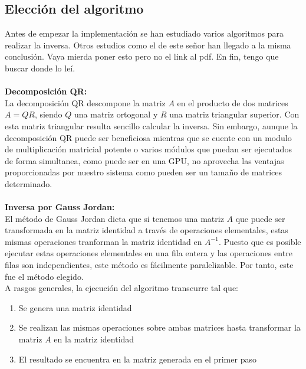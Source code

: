 \subsection{Elección del algoritmo}
Antes de empezar la implementación se han estudiado varios algoritmos para realizar la inversa.
Otros estudios como el de este señor han llegado a la misma conclusión. Vaya mierda poner esto pero no el link al pdf. En fin, tengo que buscar donde lo leí.
\\
\\
\textbf{Decomposición QR:}
\\
La decomposición QR descompone la matriz $A$ en el producto de dos matrices $A = QR$, siendo $Q$ una matriz ortogonal y $R$ una matriz triangular superior. Con esta matriz triangular resulta sencillo calcular la inversa. Sin embargo, aunque la decomposición QR puede ser beneficiosa mientras que se cuente con un modulo de multiplicación matricial potente o varios módulos que puedan ser ejecutados de forma simultanea, como puede ser en una GPU, no aprovecha las ventajas proporcionadas por nuestro sistema como pueden ser un tamaño de matrices determinado.
\\
\\
\textbf{Inversa por Gauss Jordan:}
\\
El método de Gauss Jordan dicta que si tenemos una matriz $A$ que puede ser transformada en la matriz identidad a través de operaciones elementales, estas mismas operaciones tranforman la matriz identidad en $A^{-1}$. Puesto que es posible ejecutar estas operaciones elementales en una fila entera y las operaciones entre filas son independientes, este método es fácilmente paralelizable.
Por tanto, este fue el método elegido.
\\
A rasgos generales, la ejecución del algoritmo transcurre tal que:
\begin{enumerate}
\item Se genera una matriz identidad
\item Se realizan las mismas operaciones sobre ambas matrices hasta transformar la matriz $A$ en la matriz identidad
\item El resultado se encuentra en la matriz generada en el primer paso
\end{enumerate}

